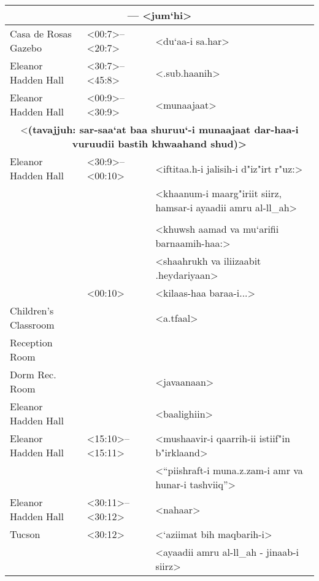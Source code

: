 \documentclass[12pt]{arabart}
\begin{document}
\begin{longtable}[c]{p{1.75in}|p{1.1in}|p{2.75in}}
\multicolumn{3}{c}{ --- <jum`hi>} \\
\hline
Casa de Rosas Gazebo & <00:7>--<20:7> & \hfill <du`aa-i sa.har> \\
Eleanor Hadden Hall & <30:7>--<45:8> & \hfill <.sub.haanih> \\
Eleanor Hadden Hall & <00:9>--<30:9> & \hfill <munaajaat> \vspace{1.5ex} \\
\multicolumn{3}{c}{<\bf (tavajjuh: sar-saa`at baa shuruu`-i munaajaat dar-haa-i vuruudii bastih khwaahand shud)>} \vspace{1.5ex} \\
Eleanor Hadden Hall & <30:9>--<00:10> & \hfill <iftitaa.h-i jalisih-i d"iz"irt r"uz:> \\
 & & \hfill <khaanum-i maarg"iriit siirz, hamsar-i ayaadii amru al-ll_ah> \\
 & &  \vspace{1.5ex} \\
 & & \hfill <khuwsh aamad va mu`arifii barnaamih-haa:> \\
 & & \hfill <shaahrukh va iliizaabit .heydariyaan> \vspace{1.5ex} \\
 & <00:10> & \hfill <kilaas-haa baraa-i...> \\
Children's Classroom & & \hfill <a.tfaal> \\
Reception Room & &  \\
Dorm Rec. Room & & \hfill <javaanaan> \\
Eleanor Hadden Hall & & \hfill <baalighiin> \vspace{1.5ex} \\
Eleanor Hadden Hall & <15:10>--<15:11> & \hfill <mushaavir-i qaarrih-ii istiif"in b"irklaand> \\
 & & \hfill <``piishraft-i muna.z.zam-i amr va hunar-i tashviiq''> \vspace{1.5ex} \\
Eleanor Hadden Hall & <30:11>--<30:12> & \hfill <nahaar> \vspace{1.5ex} \\
Tucson & <30:12> & \hfill <`aziimat bih maqbarih-i> \\
 & & \hfill <ayaadii amru al-ll_ah - jinaab-i siirz> \\
\end{longtable}
\end{document}
